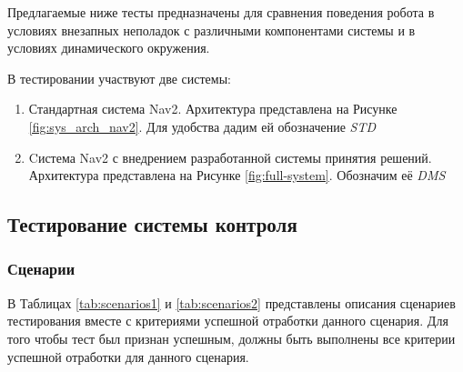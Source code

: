 Предлагаемые ниже тесты предназначены для сравнения поведения робота в условиях внезапных неполадок с различными компонентами системы и в условиях динамического окружения. 

В тестировании участвуют две системы:
\begin{enumerate}
    \item Стандартная система Nav2. Архитектура представлена на Рисунке \ref*{fig:sys_arch_nav2}. Для удобства дадим ей обозначение \textit{STD}
    \item Cистема Nav2 с внедрением разработанной системы принятия решений. Архитектура представлена на Рисунке \ref*{fig:full-system}. Обозначим её \textit{DMS}
\end{enumerate}

\subsection{Тестирование системы контроля}

\subsubsection{Сценарии}

В Таблицах \ref*{tab:scenarios1} и \ref*{tab:scenarios2} представлены описания сценариев тестирования вместе с критериями успешной отработки данного сценария. Для того чтобы тест был признан успешным, должны быть выполнены все критерии успешной отработки для данного сценария.

